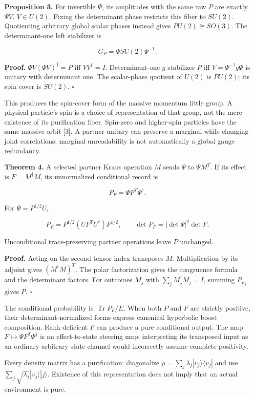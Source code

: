 \documentclass[
  11pt,
  a4paper,
]{article}
\begin{document}
\textbf{Proposition 3.} For invertible \(\Psi\), its amplitudes with the same raw \(P\) are exactly \(\Psi V\), \(V\in U(2)\). Fixing the determinant phase restricts this fiber to \(SU(2)\). Quotienting arbitrary global scalar phases instead gives \(PU(2)\cong SO(3)\). The determinant-one left stabilizer is

\[G_P=\Psi SU(2)\Psi^{-1}.\]

\textbf{Proof.} \(\Psi V(\Psi V)^\dagger=P\) iff \(VV^\dagger=I\). Determinant-one \(g\) stabilizes \(P\) iff \(V=\Psi^{-1}g\Psi\) is unitary with determinant one. The scalar-phase quotient of \(U(2)\) is \(PU(2)\); its spin cover is \(SU(2)\). \(\square\)

This produces the spin-cover form of the massive momentum little group. A physical particle's spin is a choice of representation of that group, not the mere existence of its purification fiber. Spin-zero and higher-spin particles have the same massive orbit {[}3{]}. A partner unitary can preserve a marginal while changing joint correlations; marginal unreadability is not automatically a global gauge redundancy.

\textbf{Theorem 4.} A selected partner Kraus operation \(M\) sends \(\Psi\) to \(\Psi M^T\). If its effect is \(F=M^\dagger M\), its unnormalized conditional record is

\[P_F=\Psi F^T\Psi^\dagger.\]

For \(\Psi=P^{1/2}U\),

\[P_F=P^{1/2}(UF^TU^\dagger)P^{1/2},\qquad
\det P_F=|\det\Psi|^2\det F.\]

Unconditional trace-preserving partner operations leave \(P\) unchanged.

\textbf{Proof.} Acting on the second tensor index transposes \(M\). Multiplication by its adjoint gives \((M^\dagger M)^T\). The polar factorization gives the congruence formula and the determinant factors. For outcomes \(M_j\) with \(\sum_jM_j^\dagger M_j=I\), summing \(P_{F_j}\) gives \(P\). \(\square\)

The conditional probability is \(\operatorname{Tr}P_F/E\). When both \(P\) and \(F\) are strictly positive, their determinant-normalized forms express canonical hyperbolic boost composition. Rank-deficient \(F\) can produce a pure conditional output. The map \(F\mapsto\Psi F^T\Psi^\dagger\) is an effect-to-state steering map; interpreting its transposed input as an ordinary arbitrary state channel would incorrectly assume complete positivity.

Every density matrix has a purification: diagonalize \(\rho=\sum_j\lambda_j|v_j\rangle\langle v_j|\) and use \(\sum_j\sqrt{\lambda_j}|v_j\rangle|j\rangle\). Existence of this representation does not imply that an actual environment is pure.
\end{document}
